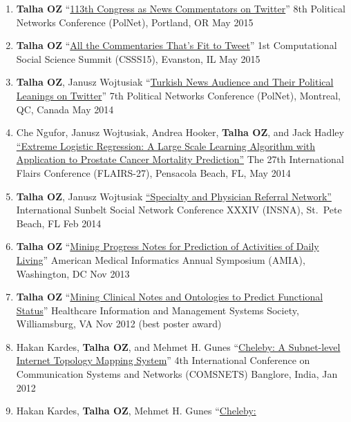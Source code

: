\documentclass[11pt, letter]{article}
\begin{document}
\begin{raggedright}
\begin{enumerate}
\def\labelenumi{\arabic{enumi}.}
\itemsep1pt\parskip0pt
\item
  \textbf{Talha OZ} ``\href{http://toz.us/pubs/\#toAppear}{113th
  Congress as News Commentators on Twitter}'' 8th Political Networks
  Conference (PolNet), Portland, OR May 2015
\item
  \textbf{Talha OZ} ``\href{http://toz.us/pubs/\#toAppear}{All the
  Commentaries That's Fit to Tweet}'' 1st Computational Social Science
  Summit (CSSS15), Evanston, IL May 2015
\item
  \textbf{Talha OZ}, Janusz Wojtusiak
  ``\href{http://www.mli.gmu.edu/toz/publications/2014-POLNET.pdf}{Turkish
  News Audience and Their Political Leanings on Twitter}'' 7th Political
  Networks Conference (PolNet), Montreal, QC, Canada May 2014
\item
  Che Ngufor, Janusz Wojtusiak, Andrea Hooker, \textbf{Talha OZ}, and
  Jack Hadley
  \href{http://www.mli.gmu.edu/toz/publications/2014-FLAIRS.pdf}{``Extreme
  Logistic Regression: A Large Scale Learning Algorithm with Application
  to Prostate Cancer Mortality Prediction''} The 27th International
  Flairs Conference (FLAIRS-27), Pensacola Beach, FL, May 2014
\item
  \textbf{Talha OZ}, Janusz Wojtusiak
  \href{http://www.mli.gmu.edu/toz/publications/2014-SUNBELT.pdf}{``Specialty
  and Physician Referral Network''} International Sunbelt Social Network
  Conference XXXIV (INSNA), St.~Pete Beach, FL Feb 2014
\item
  \textbf{Talha OZ}
  ``\href{http://www.mli.gmu.edu/toz/publications/2013-AMIA.pdf}{Mining
  Progress Notes for Prediction of Activities of Daily Living}''
  American Medical Informatics Annual Symposium (AMIA), Washington, DC
  Nov 2013
\item
  \textbf{Talha OZ}
  ``\href{http://www.mli.gmu.edu/toz/publications/2012-HIMSS.pdf}{Mining
  Clinical Notes and Ontologies to Predict Functional Status}''
  Healthcare Information and Management Systems Society, Williamsburg,
  VA Nov 2012 (best poster award)
\item
  Hakan Kardes, \textbf{Talha OZ}, and Mehmet H. Gunes
  ``\href{http://www.mli.gmu.edu/toz/publications/2012-COMSNETS.pdf}{Cheleby:
  A Subnet-level Internet Topology Mapping System}'' 4th International
  Conference on Communication Systems and Networks (COMSNETS) Banglore,
  India, Jan 2012
\item
  Hakan Kardes, \textbf{Talha OZ}, Mehmet H. Gunes
  ``\href{http://www.mli.gmu.edu/toz/publications/2011-AIMS.pdf}{Cheleby:
}
\end{enumerate}
\end{raggedright}
\end{document}
